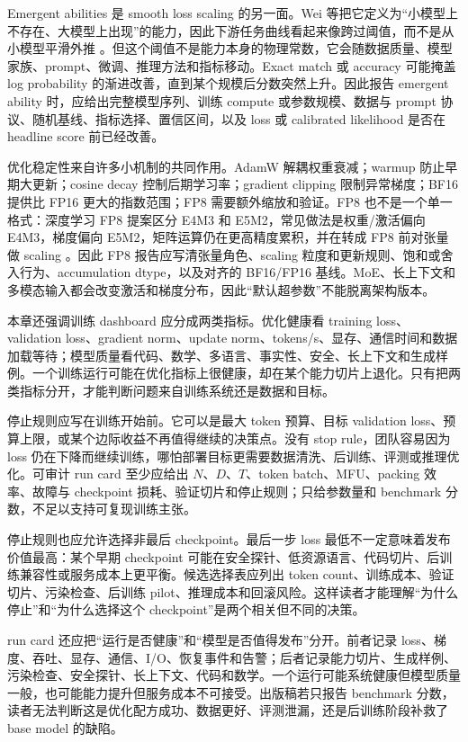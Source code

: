 \documentclass[UTF8,zihao=-4,openany]{ctexbook}
\begin{document}
Emergent abilities 是 smooth loss scaling 的另一面。Wei 等把它定义为“小模型上不存在、大模型上出现”的能力，因此下游任务曲线看起来像跨过阈值，而不是从小模型平滑外推 \cite{wei2022emergent}。但这个阈值不是能力本身的物理常数，它会随数据质量、模型家族、prompt、微调、推理方法和指标移动。Exact match 或 accuracy 可能掩盖 log probability 的渐进改善，直到某个规模后分数突然上升。因此报告 emergent ability 时，应给出完整模型序列、训练 compute 或参数规模、数据与 prompt 协议、随机基线、指标选择、置信区间，以及 loss 或 calibrated likelihood 是否在 headline score 前已经改善。

优化稳定性来自许多小机制的共同作用。AdamW 解耦权重衰减；warmup 防止早期大更新；cosine decay 控制后期学习率；gradient clipping 限制异常梯度；BF16 提供比 FP16 更大的指数范围；FP8 需要额外缩放和验证。FP8 也不是一个单一格式：深度学习 FP8 提案区分 E4M3 和 E5M2，常见做法是权重/激活偏向 E4M3，梯度偏向 E5M2，矩阵运算仍在更高精度累积，并在转成 FP8 前对张量做 scaling \cite{micikevicius2022fp8}。因此 FP8 报告应写清张量角色、scaling 粒度和更新规则、饱和或舍入行为、accumulation dtype，以及对齐的 BF16/FP16 基线。MoE、长上下文和多模态输入都会改变激活和梯度分布，因此“默认超参数”不能脱离架构版本。

本章还强调训练 dashboard 应分成两类指标。优化健康看 training loss、validation loss、gradient norm、update norm、tokens/s、显存、通信时间和数据加载等待；模型质量看代码、数学、多语言、事实性、安全、长上下文和生成样例。一个训练运行可能在优化指标上很健康，却在某个能力切片上退化。只有把两类指标分开，才能判断问题来自训练系统还是数据和目标。

停止规则应写在训练开始前。它可以是最大 token 预算、目标 validation loss、预算上限，或某个边际收益不再值得继续的决策点。没有 stop rule，团队容易因为 loss 仍在下降而继续训练，哪怕部署目标更需要数据清洗、后训练、评测或推理优化。可审计 run card 至少应给出 $N$、$D$、$T$、token batch、MFU、packing 效率、故障与 checkpoint 损耗、验证切片和停止规则；只给参数量和 benchmark 分数，不足以支持可复现训练主张。

停止规则也应允许选择非最后 checkpoint。最后一步 loss 最低不一定意味着发布价值最高：某个早期 checkpoint 可能在安全探针、低资源语言、代码切片、后训练兼容性或服务成本上更平衡。候选选择表应列出 token count、训练成本、验证切片、污染检查、后训练 pilot、推理成本和回滚风险。这样读者才能理解“为什么停止”和“为什么选择这个 checkpoint”是两个相关但不同的决策。

run card 还应把“运行是否健康”和“模型是否值得发布”分开。前者记录 loss、梯度、吞吐、显存、通信、I/O、恢复事件和告警；后者记录能力切片、生成样例、污染检查、安全探针、长上下文、代码和数学。一个运行可能系统健康但模型质量一般，也可能能力提升但服务成本不可接受。出版稿若只报告 benchmark 分数，读者无法判断这是优化配方成功、数据更好、评测泄漏，还是后训练阶段补救了 base model 的缺陷。
\end{document}
